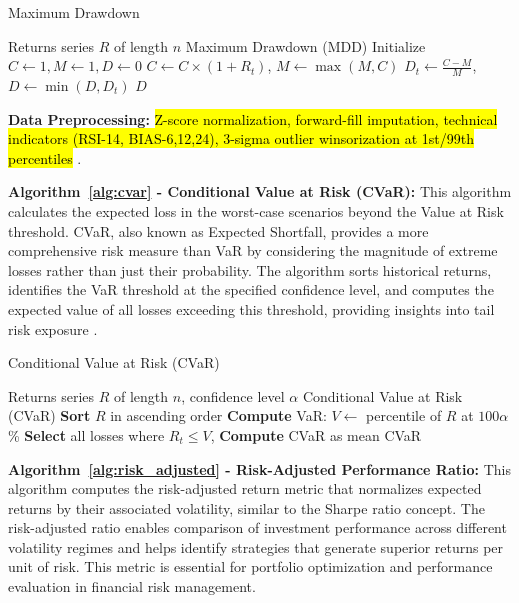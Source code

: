 \documentclass[3p,times,procedia]{elsarticle}
\begin{document}
\begin{algorithm}[H]\footnotesize\setlength{\abovecaptionskip}{-2pt}
\caption{Maximum Drawdown}
\label{alg:max_drawdown}
\begin{algorithmic}[1]
    \Require Returns series \( R \) of length \( n \)
    \Ensure Maximum Drawdown (MDD)
    \State Initialize \( C \gets 1, M \gets 1, D \gets 0 \)
        \State \( C \gets C \times (1 + R_t) \), \( M \gets \max(M, C) \)
        \State \( D_t \gets \frac{C - M}{M} \), \( D \gets \min(D, D_t) \)
    \EndFor
    \State \Return \( D \)
\end{algorithmic}
\end{algorithm}

\textbf{Data Preprocessing:} \hl{Z-score normalization, forward-fill imputation, technical indicators (RSI-14, BIAS-6,12,24), 3-sigma outlier winsorization at 1st/99th percentiles} \cite{Fischer2018}.

\textbf{Algorithm~\ref{alg:cvar} - Conditional Value at Risk (CVaR):} This algorithm calculates the expected loss in the worst-case scenarios beyond the Value at Risk threshold. CVaR, also known as Expected Shortfall, provides a more comprehensive risk measure than VaR by considering the magnitude of extreme losses rather than just their probability. The algorithm sorts historical returns, identifies the VaR threshold at the specified confidence level, and computes the expected value of all losses exceeding this threshold, providing insights into tail risk exposure \cite{Rockafellar2000}.

\begin{algorithm}[H]\footnotesize\setlength{\abovecaptionskip}{-2pt}
\caption{Conditional Value at Risk (CVaR)}
\label{alg:cvar}
\begin{algorithmic}[1]
    \Require Returns series $R$ of length $n$, confidence level $\alpha$
    \Ensure Conditional Value at Risk (CVaR)
    \State \textbf{Sort} $R$ in ascending order 
    \State \textbf{Compute} VaR: $V \gets$ percentile of $R$ at $100\alpha$\%
    \State \textbf{Select} all losses where $R_t \leq V$, \textbf{Compute} CVaR as mean
    \State \Return CVaR
\end{algorithmic}
\end{algorithm}

\textbf{Algorithm~\ref{alg:risk_adjusted} - Risk-Adjusted Performance Ratio:} This algorithm computes the risk-adjusted return metric that normalizes expected returns by their associated volatility, similar to the Sharpe ratio concept. The risk-adjusted ratio enables comparison of investment performance across different volatility regimes and helps identify strategies that generate superior returns per unit of risk. This metric is essential for portfolio optimization and performance evaluation in financial risk management.
\end{document}
